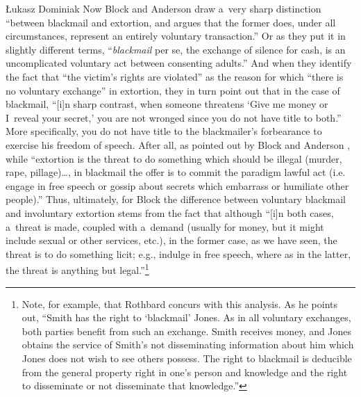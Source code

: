 \begin{artengenv}{Łukasz Dominiak}
Now Block and Anderson 
\parencite*[][p.544]{block_blackmail_2000} %
 draw a~very sharp distinction ``between blackmail and extortion, and argues that the former does, under all circumstances, represent an entirely voluntary transaction.'' Or as they 
\parencite*[][p.560]{block_blackmail_2000} %
 put it in slightly different terms, ``\textit{blackmail} per se, the exchange of silence for cash, is an uncomplicated voluntary act between consenting adults.'' And when they 
\parencite*[][p.546]{block_blackmail_2000} %
 identify the fact that ``the victim's rights are violated'' as the reason for which ``there is no voluntary exchange'' in extortion, they 
\parencite*[][p.546]{block_blackmail_2000} %
 in turn point out that in the case of blackmail, ``[i]n sharp contrast, when someone threatens ‘Give me money or I~reveal your secret,' you are not wronged since you do not have title to both.'' More specifically, you do not have title to the blackmailer's forbearance to exercise his freedom of speech. After all, as pointed out by Block and Anderson 
\parencite*[][p.546]{block_blackmail_2000}, %
 while ``extortion is the threat to do something which should be illegal (murder, rape, pillage)…, in blackmail the offer is to commit the paradigm lawful act (i.e. engage in free speech or gossip about secrets which embarrass or humiliate other people).'' Thus, ultimately, for Block 
\parencite*[][p.281]{block_libertarian_1998} %
 the difference between voluntary blackmail and involuntary extortion stems from the fact that although ``[i]n both cases, a~threat is made, coupled with a~demand (usually for money, but it might include sexual or other services, etc.), in the former case, as we have seen, the threat is to do something licit; e.g., indulge in free speech, where as in the latter, the threat is anything but legal.''\footnote{Note, for example, that Rothbard concurs with this analysis. As he 
\parencite*[][p.124]{rothbard_ethics_1998} %
 points out, ``Smith has the right to ‘blackmail' Jones. As in all voluntary exchanges, both parties benefit from such an exchange. Smith receives money, and Jones obtains the service of Smith's not disseminating information about him which Jones does not wish to see others possess. The right to blackmail is deducible from the general property right in one's person and knowledge and the right to disseminate or not disseminate that knowledge.''}




\end{artengenv}
